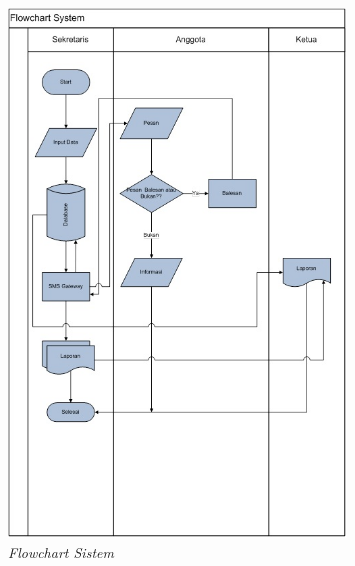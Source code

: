 \documentclass{jtetiproposalskripsi}
\begin{document}
\begin{figure}[ht!]
\centering
\includegraphics[width=0.8\textwidth]{gambar/Flowchart_sistem}
\caption{\textit{Flowchart Sistem}}
\label{wsn}
\end{figure}
\newpage
\end{document}
